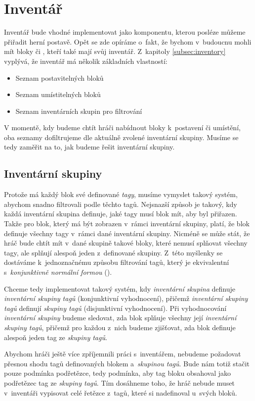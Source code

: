 
\section{Inventář}

Inventář bude vhodné implementovat jako komponentu, kterou posléze můžeme přiřadit herní postavě. Opět se zde opíráme o~fakt, že bychom v~budoucnu mohli mít bloky či \NPC{}, kteří také mají svůj inventář. Z~kapitoly \ref{subsec:inventory} vyplývá, že inventář má několik základních vlastností:

\begin{itemize}
	\item Seznam postavitelných bloků
	\item Seznam umístitelných bloků
	\item Seznam inventárních skupin pro filtrování
\end{itemize}

V momentě, kdy budeme chtít hráči nabídnout bloky k~postavení či umístění, oba seznamy dofiltrujeme dle aktuálně zvolené inventární skupiny. Musíme se tedy zaměřit na to, jak budeme řešit inventární skupiny.

\subsection{Inventární skupiny}

Protože má každý blok své definované \textit{tagy}, musíme vymyslet takový systém, abychom snadno filtrovali podle těchto tagů. Nejsnazší způsob je takový, kdy každá inventární skupina definuje, jaké tagy musí blok mít, aby byl přiřazen. Takže pro blok, který má být zobrazen v~rámci inventární skupiny, platí, že blok definuje všechny tagy v~rámci dané inventární skupiny. Nicméně se může stát, že hráč bude chtít mít v~dané skupině takové bloky, které nemusí splňovat všechny tagy, ale splňují alespoň jeden z~definované skupiny. Z~této myšlenky se dostáváme k~jednoznačnému způsobu filtrování tagů, který je ekvivalentní s~\textit{konjunktivně normální formou} (\CNF{}).


Chceme tedy implementovat takový systém, kdy \textit{inventární skupina} definuje \textit{inventární skupiny tagů} (konjunktivní vyhodnocení), přičemž \textit{inventární skupiny tagů} definují \textit{skupiny tagů} (disjunktivní vyhodnocení). Při vyhodnocování \textit{inventární skupiny} budeme sledovat, zda blok splňuje všechny její \textit{inventární skupiny tagů}, přičemž pro každou z~nich budeme zjišťovat, zda blok definuje alespoň jeden tag ze \textit{skupiny tagů}. 

Abychom hráči ještě více zpříjemnili práci s~inventářem, nebudeme požadovat přesnou shodu tagů definovaných blokem a~\textit{skupinou tagů}. Bude nám totiž stačit pouze podmínka podřetězce, tedy podmínka, aby tag bloku obsahoval jako podřetězec tag ze \textit{skupiny tagů}. Tím dosáhneme toho, že hráč nebude muset v~inventáři vypisovat celé řetězce z~tagů, které si nadefinoval u~svých bloků. 




